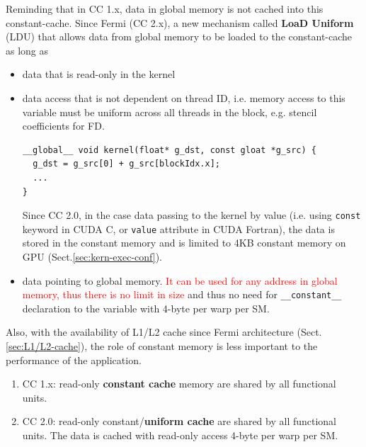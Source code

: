 Reminding that in CC 1.x, data in global memory is not
cached into this constant-cache. Since Fermi (CC 2.x), a new mechanism
called {\bf LoaD Uniform} (LDU) that allows data from global memory to be loaded
to the constant-cache as long as
\begin{itemize}
\item data that is read-only in the kernel
  
\item data access that is not dependent on thread ID, i.e.  memory
  access to this variable must be uniform across all threads in the
  block, e.g. stencil coefficients for FD.
\begin{lstlisting}
__global__ void kernel(float* g_dst, const gloat *g_src) {
  g_dst = g_src[0] + g_src[blockIdx.x];
  ...
}
\end{lstlisting}
Since CC 2.0, in the case data passing to the kernel by value (i.e.
using \verb!const! keyword in CUDA C, or \verb!value! attribute in CUDA
Fortran), the data is stored in the constant memory and is limited to 4KB
constant memory on GPU (Sect.\ref{sec:kern-exec-conf}).


\item data pointing to global memory.
  \textcolor{red}{It can be used for any address in global memory,
    thus there is no limit in size}
  and thus no need for \verb!__constant__! declaration to the variable
  with 4-byte per warp per SM.
\end{itemize}
Also, with the availability of L1/L2 cache since Fermi architecture
(Sect.\ref{sec:L1/L2-cache}), the role of constant memory is less important to
the performance of the application.

\begin{framed}
  \begin{enumerate}
  \item CC 1.x: read-only {\bf constant cache} memory are shared by all
    functional units.

  \item CC 2.0: read-only constant/{\bf uniform cache} are shared by all
    functional units. The data is cached with read-only access 4-byte
    per warp per SM.
  \end{enumerate}

\end{framed}


